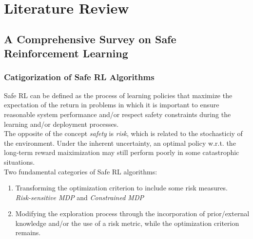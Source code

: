 




\pagestyle{scrheadings}
\clearscrheadfoot

\cfoot{\pagemark}




\section{Literature Review}

\subsection{A Comprehensive Survey on Safe Reinforcement Learning \citep{garcia_comprehensive_2015}}

\subsubsection{Catigorization of Safe RL Algorithms}
Safe RL can be defined as the process of learning policies that maximize the expectation of the return in problems in which it is important to ensure reasonable system performance and/or respect safety constraints during the learning and/or deployment processes.\\

The opposite of the concept \emph{safety} is \emph{risk}, which is related to the stochasticiy of the environment.
Under the inherent uncertainty, an optimal policy w.r.t. the long-term reward maiximization may still perform poorly in some catastrophic situations. \\

Two fundamental categories of Safe RL algorithms:
\begin{enumerate}
\item
	Transforming the optimization criterion to include some risk measures.\\
	\emph{Risk-sensitive MDP} and \emph{Constrained MDP}
\item
	Modifying the exploration process through the incorporation of prior/external knowledge and/or the use of a risk metric, while the optimization criterion remains.
\end{enumerate}


